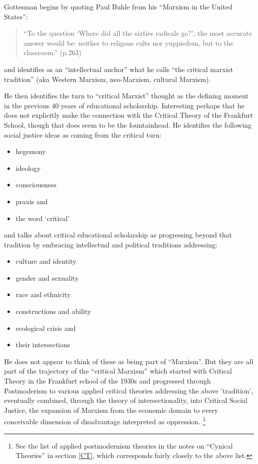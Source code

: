 \documentclass[10pt,titlepage]{book}
\begin{document}
Gottesman begins by quoting Paul Buhle from his ``Marxism in the United States''\cite{buhle-histmarx}:

\begin{quotation}
  ``To the question `Where did all the sixties radicals go?', the most accurate answer would be: neither to religous cults nor yuppiedom, but to the classroom.'' (p.263)
  \end{quotation}
and identifies as an ``intellectual anchor'' what he calls ``the critical marxist tradition'' (aka Western Marxism, neo-Marxism, cultural Marxism).

He then identifies the turn to ``critical Marxist'' thought as the defining moment in the previous 40 years of educational scholarship.
Interesting perhaps that he does not explicitly make the connection with the Critical Theory of the Frankfurt School, though that does seem to be the fountainhead.
He identifies the following social justice ideas as coming from the critical turn:

\begin{itemize}
\item hegemony
\item ideology
\item consciousness
\item praxis
  and
  \item the word `critical'
  \end{itemize}

and talks about critical educational scholarship as progressing beyond that tradition by embracing intellectual and political traditions addressing:

\begin{itemize}
\item culture and identity
\item gender and sexuality
\item race and ethnicity
\item constructions and ability
\item ecological crisis
  and
\item their intersections  
\end{itemize}

He does not appear to think of these as being part of ``Marxism''.
But they are all part of the trajectory of the ``critical Marxism'' which started with Critical Theory in the Frankfurt school of the 1930s and progressed through Postmoderism to various applied critical theories addressing the above 'tradition', eventually combined, through the theory of intersectionality, into Critical Social Justice, the expansion of Marxism from the economic domain to every conceivable dimension of disadvantage interpreted as oppression.%
\footnote{See the list of applied postmodernism theories in the notes on ``Cynical Theories'' in section \ref{CT}, which corresponds fairly closely to the above list.}
\end{document}
